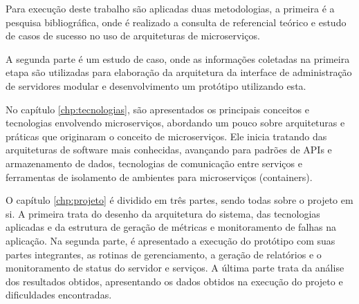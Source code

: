 Para execução deste trabalho são aplicadas duas metodologias, a primeira
é a pesquisa bibliográfica, onde é realizado a consulta de referencial
teórico e estudo de casos de sucesso no uso de arquiteturas de microserviços.

A segunda parte é um estudo de caso, onde as informações coletadas
na primeira etapa são utilizadas para elaboração da arquitetura da interface
de administração de servidores modular e desenvolvimento um protótipo
utilizando esta.

No capítulo \ref{chp:tecnologias}, são apresentados os principais conceitos
e tecnologias envolvendo microserviços, abordando um pouco sobre arquiteturas
e práticas que originaram o conceito de microserviços. Ele inicia tratando
das arquiteturas de software mais conhecidas, avançando para padrões de
\ac{APIs} e armazenamento de dados, tecnologias de comunicação entre serviços
e ferramentas de isolamento de ambientes para microserviços (containers).

O capítulo \ref{chp:projeto} é dividido em três partes, sendo todas sobre
o projeto em si. A primeira trata do desenho da arquitetura do sistema, das
tecnologias aplicadas e da estrutura de geração de métricas e monitoramento de
falhas na aplicação. Na segunda parte, é apresentado a execução do protótipo
com suas partes integrantes, as rotinas de gerenciamento, a geração de
relatórios e o monitoramento de status do servidor e serviços. A última parte
trata da análise dos resultados obtidos, apresentando os dados obtidos na
execução do projeto e dificuldades encontradas.
